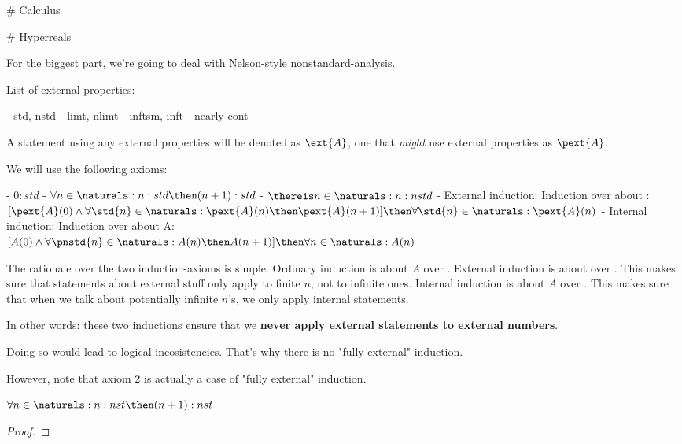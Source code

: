 # Calculus

# Hyperreals

For the biggest part, we're going to deal with Nelson-style nonstandard-analysis. 

List of external properties:

    - std, nstd
    - limt, nlimt
    - inftsm, inft
    - nearly cont


A statement using any external properties will be denoted as $\ext{A}$, one that \emph{might} use external properties as $\pext{A}$.

We will use the following axioms:
\begin{enumerate}
    - $0:std$
    - $\forall n \in \naturals: n:std \then (n+1):std $
    - $\thereis n \in \naturals: n:nstd $
    - External induction: Induction  over  about : \\ 
    $ [ \pext{A}(0) \land \forall \std{n} \in \naturals: \pext{A}(n) \then \pext{A}(n+1) ] \then \forall \std{n} \in \naturals: \pext{A}(n)$
    - Internal induction: Induction over  about A: \\
    $ [A(0) \land \forall \pnstd{n} \in \naturals: A(n) \then A(n+1)] \then \forall n \in \naturals: A(n) $
\end{enumerate}

The rationale over the two induction-axioms is simple. Ordinary induction is about $A$ over . 
External induction is about  over . This makes sure that statements about external stuff only apply to finite $n$, not to infinite ones. 
Internal induction is about $A$ over . This makes sure that when we talk about potentially infinite $n$'s, we only apply internal statements.

In other words: these two inductions ensure that we \textbf{never apply external statements to external numbers}. 

Doing so would lead to logical incosistencies. That's why there is no "fully external" induction.

However, note that axiom 2 is actually a case of "fully external" induction.


\begin{theorem}
    $ \forall n \in \naturals: n:nst \then (n+1):nst $ \label{addingNonstds}
\end{theorem}
\begin{proof}
\end{proof}

